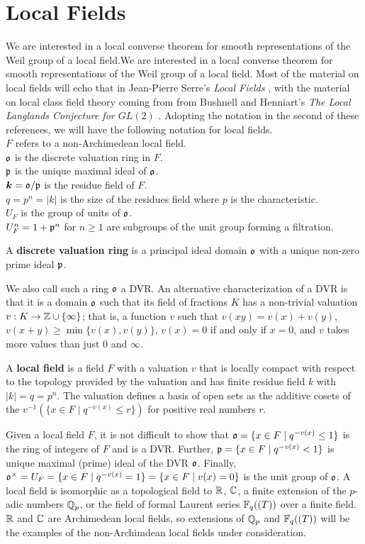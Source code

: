 \section{Local Fields}
\label{sec:local-fields}
We are interested in a local converse theorem for smooth representations of the Weil group of a local field.We are interested in a local converse theorem for smooth representations of the Weil group of a local field.
Most of the material on local fields will echo that in Jean-Pierre Serre's \textit{Local Fields} \cite{Serre1979}, with the material on local class field theory coming from from Bushnell and Henniart's \textit{The Local Langlands Conjecture for $GL(2)$} \cite{Bushnell2006}.
Adopting the notation in the second of these references, we will have the following notation for local fields.\\
$F$ refers to a non-Archimedean local field.\\
$\mathfrak{o}$ is the discrete valuation ring in $F$.\\
$\mathfrak{p}$ is the unique maximal ideal of $\mathfrak{o}$.\\
$\bm{k} = \mathfrak{o}/\mathfrak{p}$ is the residue field of $F$.\\
$q = p^n = |k|$ is the size of the residues field where $p$ is the characteristic.\\
$U_F$ is the group of units of $\mathfrak{o}$.\\
$U_F^n = 1 + \mathfrak{p}^n$ for $n \geq 1$ are subgroups of the unit group forming a filtration.\\
\begin{defn}
  A \textbf{discrete valuation ring} is a principal ideal domain $\mathfrak{o}$ with a unique non-zero prime ideal $\mathfrak{p}$.
\end{defn}
We also call such a ring $\mathfrak{o}$ a DVR.
An alternative characterization of a DVR is that it is a domain $\mathfrak{o}$ such that its field of fractions $K$ has a non-trivial valuation $v : K \to \mathbb{Z} \cup \{ \infty \}$; that is, a function $v$ such that $v(xy) = v(x) + v(y)$, $v(x+y) \geq \min \{v(x),v(y)\}$, $v(x) = 0$ if and only if $x = 0$, and $v$ takes more values than just $0$ and $\infty$.
\begin{defn}
  A \textbf{local field} is a field $F$ with a valuation $v$ that is locally compact with respect to the topology provided by the valuation and has finite residue field $k$ with $|k| = q = p^n$.
  The valuation defines a basis of open sets as the additive cosets of the $v^{-1}(\{x \in F \mid q^{-v(x)} \leq r\})$ for positive real numbers $r$.
\end{defn}
Given a local field $F$, it is not difficult to show that $\mathfrak{o} = \{x \in F \mid q^{-v(x)} \leq 1\}$ is the ring of integers of $F$ and is a DVR.
Further, $\mathfrak{p} = \{x \in F \mid q^{-v(x)} < 1\}$ is unique maximal (prime) ideal of the DVR $\mathfrak{o}$.
Finally, $\mathfrak{o}^\times = U_F = \{x \in F \mid q^{-v(x)} = 1\} = \{x \in F \mid v(x) = 0\}$ is the unit group of $\mathfrak{o}$.
A local field is isomorphic as a topological field to $\mathbb{R}$, $\mathbb{C}$, a finite extension of the $p$-adic numbers $\mathbb{Q}_p$, or the field of formal Laurent series $\mathbb{F}_q((T))$ over a finite field.
$\mathbb{R}$ and $\mathbb{C}$ are Archimedean local fields, so extensions of $\mathbb{Q}_p$ and $\mathbb{F}_q((T))$ will be the examples of the non-Archimdean local fields under consideration.
\\

